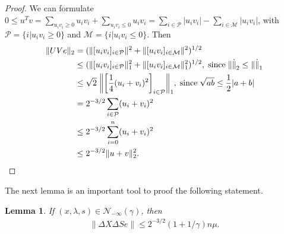 \documentclass[a4paper,10 pt,titlepage,twoside]{book}
\theoremstyle{plain}
\newtheorem{lem}[thm]{Lemma}
\theoremstyle{definition}
\theoremstyle{remark}
\begin{document}
\begin{proof}
	We can formulate $0 \leq u^{T}v = \sum\limits_{u_{i}v_{i} \geq 0}u_{i}v_{i} + \sum\limits_{u_{i}v_{i} \leq 0}u_{i}v_{i} = \sum\limits_{i \in \mathcal{P}}|u_{i}v_{i}| - \sum\limits_{i \in \mathcal{M}}|u_{i}v_{i}| $, with $\mathcal{P}= \{i | u_{i}v_{i} \geq 0\}$ and $\mathcal{M}= \{i | u_{i}v_{i} \leq 0\}$.
	Then
	\begin{align*}
	\lVert UVe \rVert_{2} &= ( \lVert[u_{i}v_{i}]_{i \in \mathcal{P}} \rVert^{2} +  \lVert[u_{i}v_{i}]_{i \in \mathcal{M}} \rVert^{2})^{1/2}\\
	&\leq ( \lVert[u_{i}v_{i}]_{i \in \mathcal{P}} \rVert^{2}_{1} +  \lVert[u_{i}v_{i}]_{i \in \mathcal{M}} \rVert^{2}_{1})^{1/2},\; \text{since\;} \lVert\dot\rVert_{2} \leq \lVert\dot\rVert_{1}\\
	&\leq\sqrt{2}\;\bigg\lVert\bigg[\frac{1}{4}(u_{i} + v_{i})^{2}\bigg]_{i\in \mathcal{P}}\bigg\rVert_{1}, \text{\;since\;} \sqrt{ab} \leq \frac{1}{2}|a+b|\\
	& = 2^{-3/2} \sum\limits_{i \in \mathcal{P}}(u_{i} + v_{i})^{2}\\
	& \leq 2^{-3/2} \sum\limits_{i = 0}^{n}(u_{i} + v_{i})^{2}\\
	& \leq 2^{-3/2} \lVert u + v \rVert^{2}_{2}.
	\end{align*}
\end{proof}	
The next lemma is an important tool to proof the following statement.
\begin{lem}\label{lem:ma1}
	If $(x, \lambda, s) \in \mathcal{N}_{-\infty}(\gamma)$, then
	\begin{align*}
	\lVert\Delta X\Delta S e \rVert \leq 2^{-3/2}(1 + 1/ \gamma)n\mu.\\
	\end{align*}
\end{lem}
\end{document}
